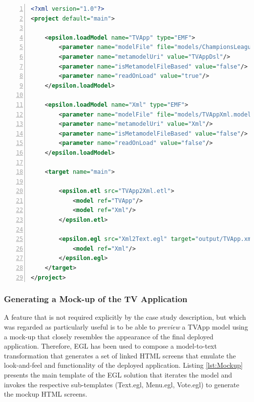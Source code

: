 \begin{lstlisting}[float=tbp, basicstyle=\ttfamily\footnotesize, nolol=true, numbers=left, flexiblecolumns=true, caption=The workflow that integrates the ETL and EGL tasks, tabsize=2, label=lst:CaseStudyCodeGenWorkflow, language=XML]
<?xml version="1.0"?>
<project default="main">
	
	<epsilon.loadModel name="TVApp" type="EMF">
		<parameter name="modelFile" file="models/ChampionsLeague.model"/>
		<parameter name="metamodelUri" value="TVAppDsl"/>
		<parameter name="isMetamodelFileBased" value="false"/>
		<parameter name="readOnLoad" value="true"/>
	</epsilon.loadModel>
	
	<epsilon.loadModel name="Xml" type="EMF">
		<parameter name="modelFile" file="models/TVAppXml.model"/>
		<parameter name="metamodelUri" value="Xml"/>
		<parameter name="isMetamodelFileBased" value="false"/> 
		<parameter name="readOnLoad" value="false"/>
	</epsilon.loadModel>

	<target name="main">

		<epsilon.etl src="TVApp2Xml.etl">
			<model ref="TVApp"/>
			<model ref="Xml"/>
		</epsilon.etl>
		
		<epsilon.egl src="Xml2Text.egl" target="output/TVApp.xml">
			<model ref="Xml"/>
		</epsilon.egl>
	</target>
</project>
\end{lstlisting}

\subsubsection{Generating a Mock-up of the TV Application}
\label{sec:Mockup}

A feature that is not required explicitly by the case study description, but which was regarded as particularly useful is to be able to \textit{preview} a TVApp model using a mock-up that closely resembles the appearance of the final deployed application. Therefore, EGL has been used to compose a model-to-text transformation that generates a set of linked HTML screens that emulate the look-and-feel and functionality of the deployed application. Listing \ref{lst:Mockup} presents the main template of the EGL solution that iterates the model and invokes the respective sub-templates (Text.egl, Menu.egl, Vote.egl) to generate the mockup HTML screens.

